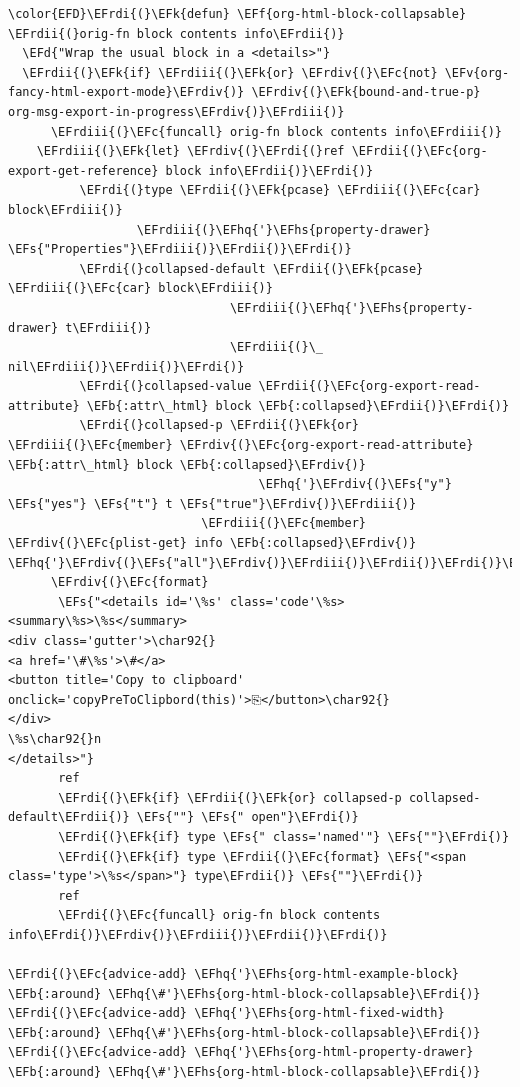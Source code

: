 \documentclass{scrartcl}
\newcommand{\EFk}[1]{\textcolor{EFk}{#1}} %
\newcommand{\EFd}[1]{\textcolor{EFd}{\textit{#1}}} %
\newcommand{\EFs}[1]{\textcolor{EFs}{#1}} %
\newcommand{\EFb}[1]{\textcolor{EFb}{#1}} %
\newcommand{\EFc}[1]{\textcolor{EFc}{#1}} %
\newcommand{\EFv}[1]{\textcolor{EFv}{#1}} %
\newcommand{\EFf}[1]{\textcolor{EFf}{#1}} %
\newcommand{\EFhq}[1]{\textcolor{EFhq}{#1}} %
\newcommand{\EFhs}[1]{\textcolor{EFhs}{#1}} %
\newcommand{\EFrdi}[1]{\textcolor{EFrdi}{#1}} %
\newcommand{\EFrdii}[1]{\textcolor{EFrdii}{#1}} %
\newcommand{\EFrdiii}[1]{\textcolor{EFrdiii}{#1}} %
\newcommand{\EFrdiv}[1]{\textcolor{EFrdiv}{#1}} %
\begin{document}
\begin{Code}
\begin{Verbatim}[]
\color{EFD}\EFrdi{(}\EFk{defun} \EFf{org-html-block-collapsable} \EFrdii{(}orig-fn block contents info\EFrdii{)}
  \EFd{"Wrap the usual block in a <details>"}
  \EFrdii{(}\EFk{if} \EFrdiii{(}\EFk{or} \EFrdiv{(}\EFc{not} \EFv{org-fancy-html-export-mode}\EFrdiv{)} \EFrdiv{(}\EFk{bound-and-true-p} org-msg-export-in-progress\EFrdiv{)}\EFrdiii{)}
      \EFrdiii{(}\EFc{funcall} orig-fn block contents info\EFrdiii{)}
    \EFrdiii{(}\EFk{let} \EFrdiv{(}\EFrdi{(}ref \EFrdii{(}\EFc{org-export-get-reference} block info\EFrdii{)}\EFrdi{)}
          \EFrdi{(}type \EFrdii{(}\EFk{pcase} \EFrdiii{(}\EFc{car} block\EFrdiii{)}
                  \EFrdiii{(}\EFhq{'}\EFhs{property-drawer} \EFs{"Properties"}\EFrdiii{)}\EFrdii{)}\EFrdi{)}
          \EFrdi{(}collapsed-default \EFrdii{(}\EFk{pcase} \EFrdiii{(}\EFc{car} block\EFrdiii{)}
                               \EFrdiii{(}\EFhq{'}\EFhs{property-drawer} t\EFrdiii{)}
                               \EFrdiii{(}\_ nil\EFrdiii{)}\EFrdii{)}\EFrdi{)}
          \EFrdi{(}collapsed-value \EFrdii{(}\EFc{org-export-read-attribute} \EFb{:attr\_html} block \EFb{:collapsed}\EFrdii{)}\EFrdi{)}
          \EFrdi{(}collapsed-p \EFrdii{(}\EFk{or} \EFrdiii{(}\EFc{member} \EFrdiv{(}\EFc{org-export-read-attribute} \EFb{:attr\_html} block \EFb{:collapsed}\EFrdiv{)}
                                   \EFhq{'}\EFrdiv{(}\EFs{"y"} \EFs{"yes"} \EFs{"t"} t \EFs{"true"}\EFrdiv{)}\EFrdiii{)}
                           \EFrdiii{(}\EFc{member} \EFrdiv{(}\EFc{plist-get} info \EFb{:collapsed}\EFrdiv{)} \EFhq{'}\EFrdiv{(}\EFs{"all"}\EFrdiv{)}\EFrdiii{)}\EFrdii{)}\EFrdi{)}\EFrdiv{)}
      \EFrdiv{(}\EFc{format}
       \EFs{"<details id='\%s' class='code'\%s>
<summary\%s>\%s</summary>
<div class='gutter'>\char92{}
<a href='\#\%s'>\#</a>
<button title='Copy to clipboard' onclick='copyPreToClipbord(this)'>⎘</button>\char92{}
</div>
\%s\char92{}n
</details>"}
       ref
       \EFrdi{(}\EFk{if} \EFrdii{(}\EFk{or} collapsed-p collapsed-default\EFrdii{)} \EFs{""} \EFs{" open"}\EFrdi{)}
       \EFrdi{(}\EFk{if} type \EFs{" class='named'"} \EFs{""}\EFrdi{)}
       \EFrdi{(}\EFk{if} type \EFrdii{(}\EFc{format} \EFs{"<span class='type'>\%s</span>"} type\EFrdii{)} \EFs{""}\EFrdi{)}
       ref
       \EFrdi{(}\EFc{funcall} orig-fn block contents info\EFrdi{)}\EFrdiv{)}\EFrdiii{)}\EFrdii{)}\EFrdi{)}

\EFrdi{(}\EFc{advice-add} \EFhq{'}\EFhs{org-html-example-block}   \EFb{:around} \EFhq{\#'}\EFhs{org-html-block-collapsable}\EFrdi{)}
\EFrdi{(}\EFc{advice-add} \EFhq{'}\EFhs{org-html-fixed-width}     \EFb{:around} \EFhq{\#'}\EFhs{org-html-block-collapsable}\EFrdi{)}
\EFrdi{(}\EFc{advice-add} \EFhq{'}\EFhs{org-html-property-drawer} \EFb{:around} \EFhq{\#'}\EFhs{org-html-block-collapsable}\EFrdi{)}
\end{Verbatim}
\end{Code}
\end{document}
